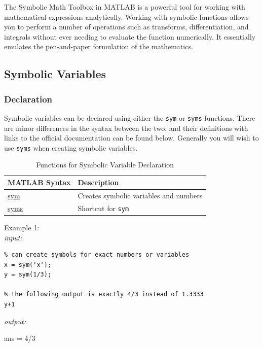 \documentclass[../MATLAB_Primer.tex]{subfiles}
\begin{document}
The Symbolic Math Toolbox in MATLAB is a powerful tool for working with mathematical expressions analytically.  Working with symbolic functions allows you to perform a number of operations such as transforms, differentiation, and integrals without ever needing to evaluate the function numerically. It essentially emulates the pen-and-paper formulation of the mathematics. 

\subsection{Symbolic Variables}
\subsubsection{Declaration}
Symbolic variables can be declared using either the \texttt{sym} or \texttt{syms} functions. There are minor differences in the syntax between the two, and their definitions with links to the official documentation can be found below.  Generally you will wish to use \texttt{syms} when creating symbolic variables. 

\begin{table}[H]
\caption{Functions for Symbolic Variable Declaration}
    \begin{center}
        \begin{tabular}{| C{3cm} | m{12cm}|}
            \hline
            \textbf{MATLAB Syntax} & \textbf{Description}\\
            
            \hline
            \href{https://www.mathworks.com/help/symbolic/sym.html}{\color{blue}sym} & Creates symbolic variables and numbers\\
            \hline
            
            \href{https://www.mathworks.com/help/symbolic/syms.html}{\color{blue}syms} & Shortcut for \texttt{sym}\\
            \hline
        \end{tabular}
        \label{tab:symbolic_variables}
    \end{center}
\end{table}

Example 1:\\

\textit{input:}
\begin{lstlisting}
% can create symbols for exact numbers or variables
x = sym('x');   
y = sym(1/3);  

% the following output is exactly 4/3 instead of 1.3333
y+1
\end{lstlisting}
\textit{output:}
\begin{center}
    ans = 4/3
\end{center}
\end{document}
